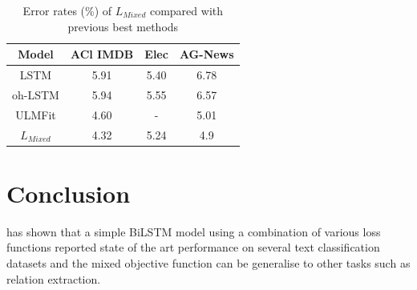 \documentclass[12pt]{article}
\begin{document}
\begin{table}[]
    \begin{tabular}{|c|c|c|c|}
        \hline
        Model & ACl IMDB & Elec & AG-News\\
        \hline
        LSTM & 5.91 & 5.40 & 6.78 \\
        oh-LSTM & 5.94 & 5.55 & 6.57 \\
        ULMFit & 4.60 & - & 5.01 \\
        \hline
        $L_{Mixed}$ & 4.32 & 5.24 & 4.9\\
        \hline
    \end{tabular}
    \caption{Error rates (\%) of $L_{Mixed}$ compared with previous best methods}
    \label{tab:results}
\end{table}

\section{Conclusion}
\cite{sachan2019revisiting} has shown that a simple BiLSTM model using a combination of various loss functions reported state of the art performance on several text classification datasets and the mixed objective function can be generalise to other tasks such as relation extraction.
\printbibliography
\end{document}

